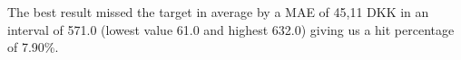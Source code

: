 \begin{table}[H]
\centering  %
\caption{The best results from the experiments and the overall improvement.} %
\label{table:OverallImprovement} %
\end{table}

The best result missed the target in average by a MAE of 45,11 DKK in an interval of 571.0 (lowest value 61.0 and highest 632.0) giving us a hit percentage of 7.90\%.

